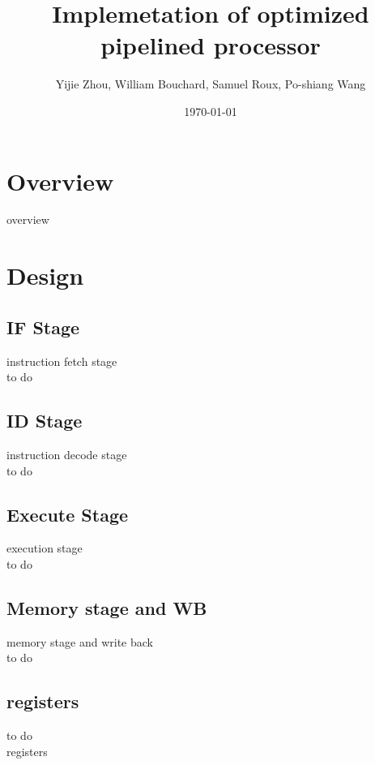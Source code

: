 \documentclass[12pt]{IEEEtran}
\title{Implemetation of optimized pipelined processor}
\date{\today}
\author{Yijie Zhou, William Bouchard, Samuel Roux, Po-shiang Wang}
\begin{document}

\section{Overview} 
\label{sec:overview}

overview

\section{Design} 
\label{sec:design}

\subsection{IF Stage} 
\label{sub:fetch_stage}

instruction fetch stage\\
to do

\subsection{ID Stage} 
\label{sub:decode_stage}

instruction decode stage\\
to do

\subsection{Execute Stage} 
\label{sub:execute_stage}
execution stage\\
to do

\subsection{Memory stage and WB} 
\label{sub:memory_and_write_back}
memory stage and write back\\
to do

\subsection{registers}
\label{sub:stage_interconnection}
to do\\
registers
\end{document}
